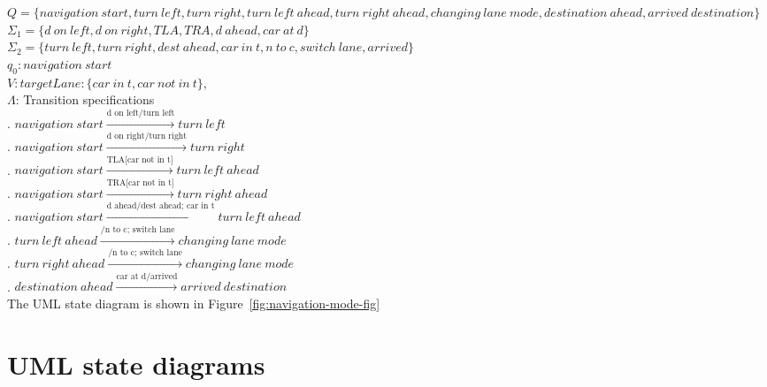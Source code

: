 \documentclass[12pt]{article}
\begin{document}
\begin{spacing}{1.5}
\noindent $Q = \{navigation~start, turn~left,turn~right, turn~left~ahead, turn~right~ahead, changing~lane~mode,destination~ahead, arrived~destination\}$\\
\noindent $\Sigma_1 = \{d~on~left, d~on~right, TLA, TRA, d~ahead, car~at~d\}$\\
\noindent $\Sigma_2 = \{turn~left, turn~right, dest~ahead, car~in~t, n~to~c, switch~lane, arrived\}$\\
\noindent $q_0: navigation~start$\\
\noindent $V: targetLane: \{car~in~t, car~not~in~t\}$,\\
\noindent $\Lambda$: Transition specifications\\
. $navigation~start\xrightarrow {\text{d on left/turn left}} turn~left$\\
. $navigation~start\xrightarrow {\text{d on right/turn right}} turn~right$\\
. $navigation~start\xrightarrow {\text{TLA[car not in t]}} turn~left~ahead$\\
. $navigation~start\xrightarrow {\text{TRA[car not in t]}} turn~right~ahead$\\
. $navigation~start\xrightarrow {\text{d ahead/dest ahead; car in t}} turn~left~ahead$\\
. $turn~left~ahead\xrightarrow {\text{/n to c; switch lane}} changing~lane~mode$\\
. $turn~right~ahead\xrightarrow {\text{/n to c; switch lane}} changing~lane~mode$\\
. $destination~ahead\xrightarrow {\text{car at d/arrived}} arrived~destination$\\

\noindent The UML state diagram is shown in Figure~\ref{fig:navigation-mode-fig}\\

\newpage

\section{UML state diagrams}


\end{spacing}
\end{document}
